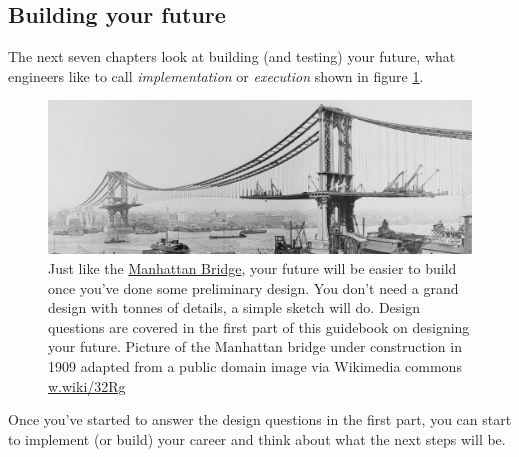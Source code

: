 \documentclass[
]{book}
\begin{document}
\hypertarget{partii}{%
\subsection{Building your future}\label{partii}}

The next seven chapters look at building (and testing) your future, what engineers like to call \emph{implementation} or \emph{execution} shown in figure \ref{fig:manhattan-fig}.

\begin{figure}

{\centering \includegraphics[width=1\linewidth]{images/manhattan_bridge} 

}

\caption{Just like the \href{https://en.wikipedia.org/wiki/Manhattan_Bridge}{Manhattan Bridge}, your future will be easier to build once you've done some preliminary design. You don't need a grand design with tonnes of details, a simple sketch will do. Design questions are covered in the first part of this guidebook on designing your future. Picture of the Manhattan bridge under construction in 1909 adapted from a public domain image via Wikimedia commons \href{https://w.wiki/32Rg}{w.wiki/32Rg}}\label{fig:manhattan-fig}
\end{figure}



Once you've started to answer the design questions in the first part, you can start to implement (or build) your career and think about what the next steps will be.
\end{document}
